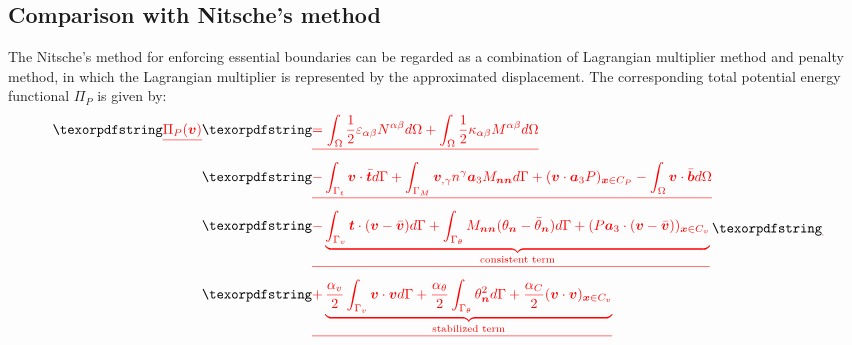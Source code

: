 \subsection{Comparison with Nitsche's method}
The Nitsche's method for enforcing essential boundaries can be regarded as a combination of Lagrangian multiplier method and penalty method, in which the Lagrangian multiplier is represented by the approximated displacement. The corresponding total potential energy functional $\Pi_P$ is given by:
\DIFdelbegin \begin{displaymath}
\begin{split}
\DIFdel{\Pi_P(\boldsymbol v) }&\DIFdel{= \int_\Omega \frac{1}{2}\varepsilon_{\alpha\beta} N^{\alpha\beta} d\Omega +
\int_\Omega \frac{1}{2} \kappa_{\alpha\beta}M^{\alpha\beta} d\Omega }\\
                     &\DIFdel{- \int_{\Gamma_t} \boldsymbol v \cdot \bar{\boldsymbol t} d\Gamma 
                     + \int_{\Gamma_M} \boldsymbol v_{,\gamma} n^\gamma \boldsymbol a_3 M_{\boldsymbol{nn}} d\Gamma
                     + (\boldsymbol v \cdot \boldsymbol a_3 P)_{\boldsymbol x \in C_P}
                     - \int_\Omega \boldsymbol v \cdot \bar{\boldsymbol b} d\Omega }\\
                     &\DIFdel{- \underbrace{\int_{\Gamma_v} \boldsymbol t \cdot (\boldsymbol v - \bar{\boldsymbol v}) d\Gamma
                     + \int_{\Gamma_\theta} M_{\boldsymbol{nn}}(\theta_{\boldsymbol n} - \bar \theta_{\boldsymbol n})d\Gamma
                     + (P\boldsymbol a_3 \cdot (\boldsymbol v - \bar{\boldsymbol v}))_{\boldsymbol x \in C_v}}_{\text{consistent term}} }\\
                     &\DIFdel{+ \underbrace{\frac{\alpha_v}{2} \int_{\Gamma_v} \boldsymbol v \cdot \boldsymbol v d\Gamma 
                     + \frac{\alpha_\theta}{2} \int_{\Gamma_\theta} \theta_{\boldsymbol n}^2 d\Gamma
             + \frac{\alpha_C}{2}(\boldsymbol v \cdot \boldsymbol v)_{\boldsymbol x\in C_v}}_{\text{stabilized term}}
}\end{split}
\DIFdel{}\end{displaymath}%
